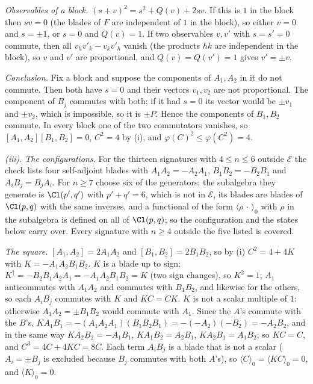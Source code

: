 \emph{Observables of a block.} $(s + v)^{2} = s^{2} + Q(v) + 2sv$. If this is $1$ in the block then $sv = 0$ (the blades of $F$ are independent of $1$ in the block), so either $v = 0$ and $s = \pm 1$, or $s = 0$ and $Q(v) = 1$. If two observables $v, v'$ with $s = s' = 0$ commute, then all $v_{h}v'_{k} - v_{k}v'_{h}$ vanish (the products $hk$ are independent in the block), so $v$ and $v'$ are proportional, and $Q(v) = Q(v') = 1$ gives $v' = \pm v$.

\emph{Conclusion.} Fix a block and suppose the components of $A_{1}, A_{2}$ in it do not commute. Then both have $s = 0$ and their vectors $v_{1}, v_{2}$ are not proportional. The component of $B_{j}$ commutes with both; if it had $s = 0$ its vector would be $\pm v_{1}$ and $\pm v_{2}$, which is impossible, so it is $\pm P$. Hence the components of $B_{1}, B_{2}$ commute. In every block one of the two commutators vanishes, so $[A_{1},A_{2}][B_{1},B_{2}] = 0$, $C^{2} = 4$ by (i), and $\varphi(C)^{2} \le \varphi(C^{2}) = 4$.

\emph{(iii).} \emph{The configurations.} For the thirteen signatures with $4 \le n \le 6$ outside $\mathcal{E}$ the check lists four self-adjoint blades with $A_{1}A_{2} = -A_{2}A_{1}$, $B_{1}B_{2} = -B_{2}B_{1}$ and $A_{i}B_{j} = B_{j}A_{i}$. For $n \ge 7$ choose six of the generators; the subalgebra they generate is $\Cl(p',q')$ with $p' + q' = 6$, which is not in $\mathcal{E}$, its blades are blades of $\Cl(p,q)$ with the same inverses, and a functional of the form $\langle\rho\,\cdot\,\rangle_{0}$ with $\rho$ in the subalgebra is defined on all of $\Cl(p,q)$; so the configuration and the states below carry over. Every signature with $n \ge 4$ outside the five listed is covered.

\emph{The square.} $[A_{1},A_{2}] = 2A_{1}A_{2}$ and $[B_{1},B_{2}] = 2B_{1}B_{2}$, so by (i) $C^{2} = 4 + 4K$ with $K = -A_{1}A_{2}B_{1}B_{2}$. $K$ is a blade up to sign; $K^{\dagger} = -B_{2}B_{1}A_{2}A_{1} = -A_{1}A_{2}B_{1}B_{2} = K$ (two sign changes), so $K^{2} = 1$; $A_{1}$ anticommutes with $A_{1}A_{2}$ and commutes with $B_{1}B_{2}$, and likewise for the others, so each $A_{i}B_{j}$ commutes with $K$ and $KC = CK$. $K$ is not a scalar multiple of $1$: otherwise $A_{1}A_{2} = \pm B_{1}B_{2}$ would commute with $A_{1}$. Since the $A$'s commute with the $B$'s, $KA_{1}B_{1} = -(A_{1}A_{2}A_{1})(B_{1}B_{2}B_{1}) = -(-A_{2})(-B_{2}) = -A_{2}B_{2}$, and in the same way $KA_{2}B_{2} = -A_{1}B_{1}$, $KA_{1}B_{2} = A_{2}B_{1}$, $KA_{2}B_{1} = A_{1}B_{2}$; so $KC = C$, and $C^{3} = 4C + 4KC = 8C$. Each term $A_{i}B_{j}$ is a blade that is not a scalar ($A_{i} = \pm B_{j}$ is excluded because $B_{j}$ commutes with both $A$'s), so $\langle C\rangle_{0} = \langle KC\rangle_{0} = 0$, and $\langle K\rangle_{0} = 0$.

